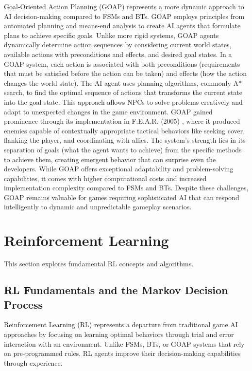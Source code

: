 Goal-Oriented Action Planning (GOAP) represents a more dynamic approach to AI decision-making compared to FSMs and BTs. 
GOAP employs principles from automated planning and means-end analysis to create AI agents that formulate plans to achieve specific goals. Unlike more rigid systems, GOAP agents dynamically determine action sequences by considering current world states, available actions with preconditions and effects, and desired goal states.
In a GOAP system, each action is associated with both preconditions (requirements that must be satisfied before the action can be taken) and effects (how the action changes the world state).
The AI agent uses planning algorithms, commonly A* search, to find the optimal sequence of actions that transforms the current state into the goal state. 
This approach allows NPCs to solve problems creatively and adapt to unexpected changes in the game environment.
GOAP gained prominence through its implementation in F.E.A.R. (2005) \cite{thompson2020fear}, where it produced enemies capable of contextually appropriate tactical behaviors like seeking cover, flanking the player, and coordinating with allies. 
The system's strength lies in its separation of goals (what the agent wants to achieve) from the specific methods to achieve them, creating emergent behavior that can surprise even the developers.
While GOAP offers exceptional adaptability and problem-solving capabilities, it comes with higher computational costs and increased implementation complexity compared to FSMs and BTs. Despite these challenges, GOAP remains valuable for games requiring sophisticated AI that can respond intelligently to dynamic and unpredictable gameplay scenarios.

\section{Reinforcement Learning}

This section explores fundamental RL concepts and algorithms.

\subsection{RL Fundamentals and the Markov Decision Process}

Reinforcement Learning (RL) represents a departure from traditional game AI approaches by focusing on learning optimal behaviors through trial and error interaction with an environment. 
Unlike FSMs, BTs, or GOAP systems that rely on pre-programmed rules, RL agents improve their decision-making capabilities through experience.

